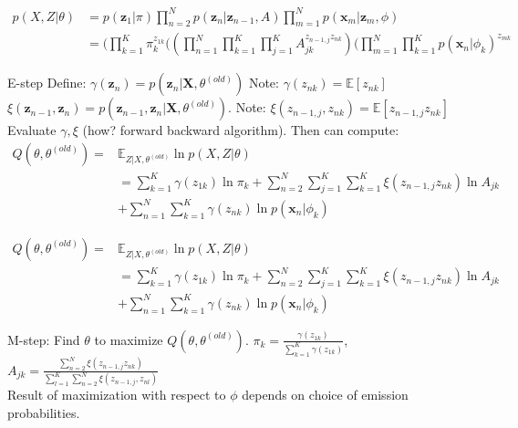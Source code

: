 \documentclass[10pt]{beamer}
\begin{document}
\begin{frame}
\begin{equation*}
\begin{split}
p(X, Z | \theta) &= p(\mathbf{z}_1| \pi) \prod_{n=2}^N p(\mathbf{z}_n | \mathbf{z}_{n-1}, A) \prod_{m=1}^N p(\mathbf{x}_m | \mathbf{z}_m, \phi) \\
&=(\prod_{k=1}^{K} \pi_k^{z_{1k} }((\prod_{n=1}^N\prod_{k=1}^K \prod_{j=1}^K A_{jk}^{z_{n-1,j}z_{nk} })( \prod_{m=1}^N \prod_{k=1}^K p(\mathbf{x}_n | \phi_k)^{ z_{mk}}
 \end{split}
 \end{equation*}
\begin{sblock}{E-step}
Define: $\gamma(\mathbf{z}_n)  = p(\mathbf{z}_n | \mathbf{X}, \theta^{(old)})$ Note: $\gamma(z_{nk}) = \mathbb{E}[z_{nk}] $ \\%
$\xi( \mathbf{z}_{n-1}, \mathbf{z}_n) = p(\mathbf{z}_{n-1}, \mathbf{z}_n |  \mathbf{X}, \theta^{(old)}).$ Note: $\xi(z_{n-1, j}, z_{nk} ) = \mathbb{E}[z_{n-1,j}z_{nk}] $\\%
Evaluate $\gamma, \xi$ (how? forward backward algorithm). Then can compute:
\begin{equation*}
\begin{split}
Q(\theta, \theta^{(old)}) =& \mathbb{E}_{Z | X, \theta^{(old)}} \ln p(X, Z | \theta) \\
&= \sum_{k=1}^K \gamma(z_{1k}) \ln \pi_k + \sum_{n=2}^N \sum_{j=1}^K \sum_{k=1}^K \xi(z_{n-1, j} z_{nk}) \ln A_{jk}\\
&+ \sum_{n=1}^N\sum_{k=1}^K \gamma(z_{nk}) \ln p(\mathbf{x}_n | \phi_k)
\end{split}
\end{equation*}
\end{sblock}
\end{frame}


\begin{frame}
\begin{equation*}
\begin{split}
Q(\theta, \theta^{(old)}) =& \mathbb{E}_{Z | X, \theta^{(old)}} \ln p(X, Z | \theta) \\
&= \sum_{k=1}^K \gamma(z_{1k}) \ln \pi_k + \sum_{n=2}^N \sum_{j=1}^K \sum_{k=1}^K \xi(z_{n-1, j} z_{nk}) \ln A_{jk}\\
&+ \sum_{n=1}^N\sum_{k=1}^K \gamma(z_{nk}) \ln p(\mathbf{x}_n | \phi_k)
\end{split}
\end{equation*}
\begin{sblock}{M-step: Find $\theta$ to maximize $Q(\theta, \theta^{(old)})$.}
$\pi_k = \frac{\gamma(z_{1k})}{\sum_{k=1}^K \gamma(z_{1k})}$, $A_{jk} = \frac {\sum_{n=2}^N \xi(z_{n-1, j} z_{nk})}{\sum_{l=1}^K\sum_{n=2}^N \xi(z_{n-1,j},z_{nl})}$ \\
Result of maximization with respect to $\phi$ depends on choice of emission probabilities.
\end{sblock}
\end{frame}
\end{document}
